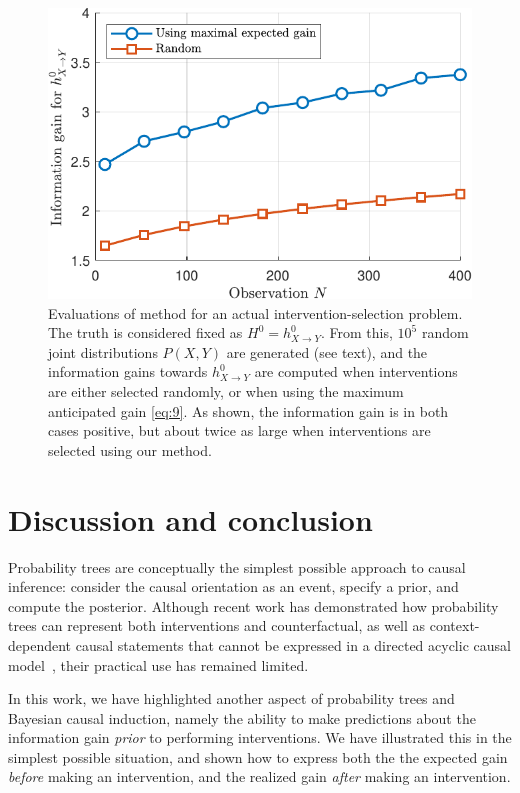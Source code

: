 \documentclass[letterpaper]{article} %
\begin{document}
\begin{figure}[t!]
\centering
\includegraphics[width=.8\linewidth]{fig4xy-crop}
\caption{Evaluations of method for an actual intervention-selection problem. The truth is considered fixed as $H^0 = h^0_{X \rightarrow Y}$. From this, $10^5$ random joint distributions $P(X,Y)$ are generated (see text), and the information gains towards $h^0_{X \rightarrow Y}$ are computed when interventions are either selected randomly, or when using the maximum anticipated gain \cref{eq:9}. As shown, the information gain is in both cases positive, but about twice as large when interventions are selected using our method. }\label{fig5}
\end{figure}

\section{Discussion and conclusion}
Probability trees are conceptually the simplest possible approach to causal inference: consider the causal orientation as an event, specify a prior, and compute the posterior. Although recent work has demonstrated how probability trees can represent both interventions and counterfactual, as well as context-dependent causal statements that cannot be expressed in a directed acyclic causal model~\cite{genewein2020algorithms}, their practical use has remained limited.

In this work, we have highlighted another aspect of probability trees and Bayesian causal induction, namely the ability to make predictions about the information gain \emph{prior} to performing interventions. We have illustrated this in the simplest possible situation, and shown how to express both the the expected gain \emph{before} making an intervention, and the realized gain \emph{after} making an intervention. %
\end{document}
